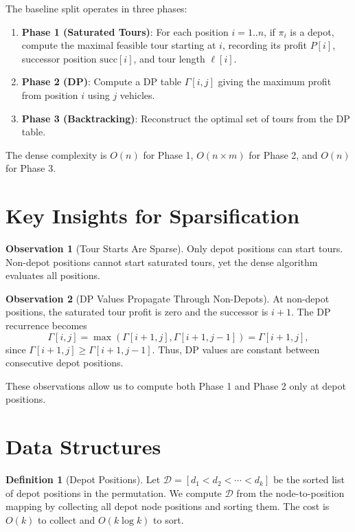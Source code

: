 \documentclass[11pt]{article}
\theoremstyle{definition}
\newtheorem{definition}{Definition}[section]
\newtheorem{observation}{Observation}[section]
\begin{document}
The baseline split operates in three phases:
\begin{enumerate}[nosep]
  \item \textbf{Phase 1 (Saturated Tours)}: For each position $i = 1..n$, if $\pi_i$ is a depot, compute the maximal feasible tour starting at $i$, recording its profit $P[i]$, successor position $\text{succ}[i]$, and tour length $\ell[i]$.
  \item \textbf{Phase 2 (DP)}: Compute a DP table $\Gamma[i, j]$ giving the maximum profit from position $i$ using $j$ vehicles.
  \item \textbf{Phase 3 (Backtracking)}: Reconstruct the optimal set of tours from the DP table.
\end{enumerate}

The dense complexity is $O(n)$ for Phase 1, $O(n \times m)$ for Phase 2, and $O(n)$ for Phase 3.

\section{Key Insights for Sparsification}

\begin{observation}[Tour Starts Are Sparse]
Only depot positions can start tours. Non-depot positions cannot start saturated tours, yet the dense algorithm evaluates all positions.
\end{observation}

\begin{observation}[DP Values Propagate Through Non-Depots]
At non-depot positions, the saturated tour profit is zero and the successor is $i+1$. The DP recurrence becomes
\[
\Gamma[i, j] = \max(\Gamma[i+1, j], \Gamma[i+1, j-1]) = \Gamma[i+1, j],
\]
since $\Gamma[i+1, j] \ge \Gamma[i+1, j-1]$. Thus, DP values are constant between consecutive depot positions.
\end{observation}

These observations allow us to compute both Phase 1 and Phase 2 only at depot positions.

\section{Data Structures}

\begin{definition}[Depot Positions]
Let $\mathcal{D} = [d_1 < d_2 < \cdots < d_k]$ be the sorted list of depot positions in the permutation. We compute $\mathcal{D}$ from the node-to-position mapping by collecting all depot node positions and sorting them. The cost is $O(k)$ to collect and $O(k \log k)$ to sort.
\end{definition}
\end{document}
